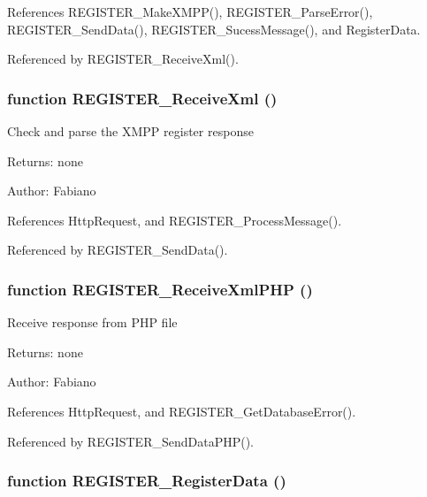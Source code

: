 References REGISTER\_\-MakeXMPP(), REGISTER\_\-ParseError(), REGISTER\_\-SendData(), REGISTER\_\-SucessMessage(), and RegisterData.

Referenced by REGISTER\_\-ReceiveXml().
\subsubsection{\setlength{\rightskip}{0pt plus 5cm}function REGISTER\_\-ReceiveXml ()}\label{register_8js_529d8fd46e940d2c418616e7288a9bef}


Check and parse the XMPP register response

\begin{Desc}
\item[Returns:]none \end{Desc}
\begin{Desc}
\item[Author:]Fabiano \end{Desc}


References HttpRequest, and REGISTER\_\-ProcessMessage().

Referenced by REGISTER\_\-SendData().
\subsubsection{\setlength{\rightskip}{0pt plus 5cm}function REGISTER\_\-ReceiveXmlPHP ()}\label{register_8js_05f0881d7603861b5b37ec98d0468d42}


Receive response from PHP file \begin{Desc}
\item[Returns:]none\end{Desc}
\begin{Desc}
\item[Author:]Fabiano \end{Desc}


References HttpRequest, and REGISTER\_\-GetDatabaseError().

Referenced by REGISTER\_\-SendDataPHP().
\subsubsection{\setlength{\rightskip}{0pt plus 5cm}function REGISTER\_\-RegisterData ()}\label{register_8js_387c9e547a2a2c6b8bb3daa4b82e5645}




